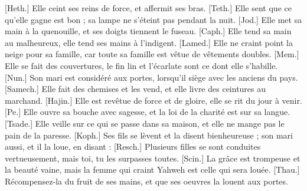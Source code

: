 \begin{multicols}{2}
[Heth.] Elle ceint ses reins de force, et affermit ses bras.
[Teth.] Elle sent que ce qu’elle gagne est bon ; sa lampe ne s'éteint pas pendant la nuit.
[Jod.] Elle met sa main à la quenouille, et ses doigts tiennent le fuseau.
[Caph.] Elle tend sa main au malheureux, elle tend ses mains à l’indigent.
[Lamed.] Elle ne craint point la neige pour sa famille, car toute sa famille est vêtue de vêtements doubles.
[Mem.] Elle se fait des couvertures, le fin lin et l'écarlate sont ce dont elle s'habille.
[Nun.] Son mari est considéré aux portes, lorsqu’il siège avec les anciens du pays.
[Samech.] Elle fait des chemises et les vend, et elle livre des ceintures au marchand.
[Hajin.] Elle est revêtue de force et de gloire, elle se rit du jour à venir.
[Pe.] Elle ouvre sa bouche avec sagesse, et la loi de la charité est sur sa langue.
[Tsade.] Elle veille sur ce qui se passe dans sa maison, et elle ne mange pas le pain de la paresse.
[Koph.] Ses fils se lèvent et la disent bienheureuse ; son mari aussi, et il la loue, en disant :
[Resch.] Plusieurs filles se sont conduites vertueusement, mais toi, tu les surpasses toutes.
[Scin.] La grâce est trompeuse et la beauté vaine, mais la femme qui craint Yahweh est celle qui sera louée.
[Thau.] Récompensez-la du fruit de ses mains, et que ses oeuvres la louent aux portes.
\PPE{}
\end{multicols}
